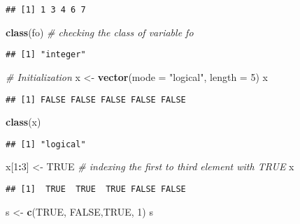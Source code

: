 \documentclass[
]{article}
\newenvironment{Shaded}{\begin{snugshade}}{\end{snugshade}}
\newcommand{\AttributeTok}[1]{\textcolor[rgb]{0.13,0.29,0.53}{#1}}
\newcommand{\CommentTok}[1]{\textcolor[rgb]{0.56,0.35,0.01}{\textit{#1}}}
\newcommand{\ConstantTok}[1]{\textcolor[rgb]{0.56,0.35,0.01}{#1}}
\newcommand{\DecValTok}[1]{\textcolor[rgb]{0.00,0.00,0.81}{#1}}
\newcommand{\FunctionTok}[1]{\textcolor[rgb]{0.13,0.29,0.53}{\textbf{#1}}}
\newcommand{\NormalTok}[1]{#1}
\newcommand{\OtherTok}[1]{\textcolor[rgb]{0.56,0.35,0.01}{#1}}
\newcommand{\SpecialCharTok}[1]{\textcolor[rgb]{0.81,0.36,0.00}{\textbf{#1}}}
\newcommand{\StringTok}[1]{\textcolor[rgb]{0.31,0.60,0.02}{#1}}
\begin{document}
\begin{verbatim}
## [1] 1 3 4 6 7
\end{verbatim}

\begin{Shaded}
\begin{Highlighting}[]
\FunctionTok{class}\NormalTok{(fo) }\CommentTok{\# checking the class of variable fo}
\end{Highlighting}
\end{Shaded}

\begin{verbatim}
## [1] "integer"
\end{verbatim}

\begin{Shaded}
\begin{Highlighting}[]
\CommentTok{\# Initialization}
\NormalTok{x }\OtherTok{\textless{}{-}} \FunctionTok{vector}\NormalTok{(}\AttributeTok{mode =} \StringTok{"logical"}\NormalTok{, }\AttributeTok{length =} \DecValTok{5}\NormalTok{)}
\NormalTok{x}
\end{Highlighting}
\end{Shaded}

\begin{verbatim}
## [1] FALSE FALSE FALSE FALSE FALSE
\end{verbatim}

\begin{Shaded}
\begin{Highlighting}[]
\FunctionTok{class}\NormalTok{(x)}
\end{Highlighting}
\end{Shaded}

\begin{verbatim}
## [1] "logical"
\end{verbatim}

\begin{Shaded}
\begin{Highlighting}[]
\NormalTok{x[}\DecValTok{1}\SpecialCharTok{:}\DecValTok{3}\NormalTok{] }\OtherTok{\textless{}{-}} \ConstantTok{TRUE} \CommentTok{\# indexing the first to third element with TRUE}
\NormalTok{x}
\end{Highlighting}
\end{Shaded}

\begin{verbatim}
## [1]  TRUE  TRUE  TRUE FALSE FALSE
\end{verbatim}

\begin{Shaded}
\begin{Highlighting}[]
\NormalTok{s }\OtherTok{\textless{}{-}} \FunctionTok{c}\NormalTok{(}\ConstantTok{TRUE}\NormalTok{, }\ConstantTok{FALSE}\NormalTok{,}\ConstantTok{TRUE}\NormalTok{, }\DecValTok{1}\NormalTok{)}
\NormalTok{s}
\end{Highlighting}
\end{Shaded}
\end{document}
